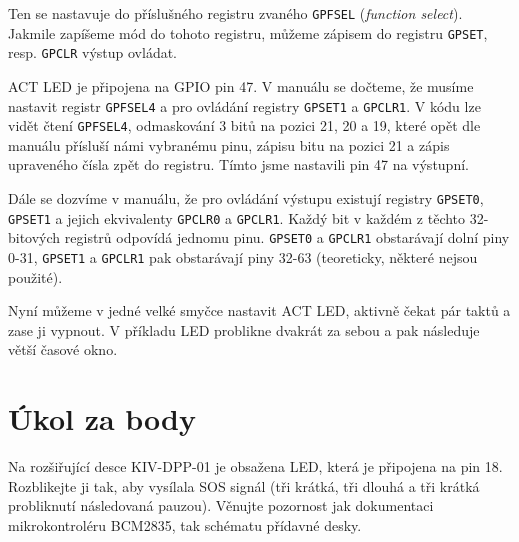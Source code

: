 \documentclass{article}
\begin{document}
Ten se nastavuje do příslušného registru zvaného \texttt{GPFSEL} (\emph{function select}). Jakmile zapíšeme mód do tohoto registru, můžeme zápisem do registru \texttt{GPSET}, resp. \texttt{GPCLR} výstup ovládat.

ACT LED je připojena na GPIO pin 47. V manuálu se dočteme, že musíme nastavit registr \texttt{GPFSEL4} a pro ovládání registry \texttt{GPSET1} a \texttt{GPCLR1}. V kódu lze vidět čtení \texttt{GPFSEL4}, odmaskování 3 bitů na pozici 21, 20 a 19, které opět dle manuálu přísluší námi vybranému pinu, zápisu bitu na pozici 21 a zápis upraveného čísla zpět do registru. Tímto jsme nastavili pin 47 na výstupní.

Dále se dozvíme v manuálu, že pro ovládání výstupu existují registry \texttt{GPSET0}, \texttt{GPSET1} a jejich ekvivalenty \texttt{GPCLR0} a \texttt{GPCLR1}. Každý bit v každém z těchto 32-bitových registrů odpovídá jednomu pinu. \texttt{GPSET0} a \texttt{GPCLR1} obstarávají dolní piny 0-31, \texttt{GPSET1} a \texttt{GPCLR1} pak obstarávají piny 32-63 (teoreticky, některé nejsou použité).

Nyní můžeme v jedné velké smyčce nastavit ACT LED, aktivně čekat pár taktů a zase ji vypnout. V příkladu LED problikne dvakrát za sebou a pak následuje větší časové okno.

\section{Úkol za body}

Na rozšiřující desce KIV-DPP-01 je obsažena LED, která je připojena na pin 18. Rozblikejte ji tak, aby vysílala SOS signál (tři krátká, tři dlouhá a tři krátká probliknutí následovaná pauzou). Věnujte pozornost jak dokumentaci mikrokontroléru BCM2835, tak schématu přídavné desky.
\end{document}
